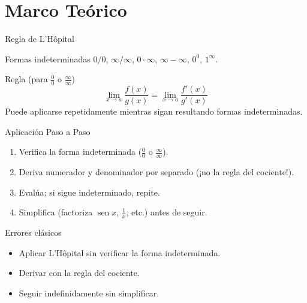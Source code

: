 \documentclass[aspectratio=169]{beamer}
\begin{document}
\begin{frame}[plain]
  \titlepage
\end{frame}

\section{Marco Teórico}

\begin{frame}{Regla de L'Hôpital}
  \begin{block}{Formas indeterminadas}
    $0/0$, $\infty/\infty$, $0\cdot\infty$, $\infty - \infty$, $0^0$, $1^\infty$.
  \end{block}
  \vspace{6pt}
  \begin{block}{Regla (para $\frac{0}{0}$ o $\frac{\infty}{\infty}$)}
    \[
      \lim_{x\to a}\frac{f(x)}{g(x)} = \lim_{x\to a}\frac{f'(x)}{g'(x)}
    \]
    Puede aplicarse repetidamente mientras sigan resultando formas indeterminadas.
  \end{block}
\end{frame}

\begin{frame}{Aplicación Paso a Paso}
  \begin{mwpasos}[Pasos]
    \begin{enumerate}
      \item Verifica la forma indeterminada ($\frac{0}{0}$ o $\frac{\infty}{\infty}$).
      \item Deriva numerador y denominador por separado (¡no la regla del cociente!).
      \item Evalúa; si sigue indeterminado, repite.
      \item Simplifica (factoriza $\operatorname{sen} x$, $\frac{1}{x}$, etc.) antes de seguir.
    \end{enumerate}
  \end{mwpasos}
  \vspace{6pt}
  \begin{alertblock}{Errores clásicos}
    \begin{itemize}
      \item Aplicar L'Hôpital sin verificar la forma indeterminada.
      \item Derivar con la regla del cociente.
      \item Seguir indefinidamente sin simplificar.
    \end{itemize}
  \end{alertblock}
\end{frame}
\end{document}

